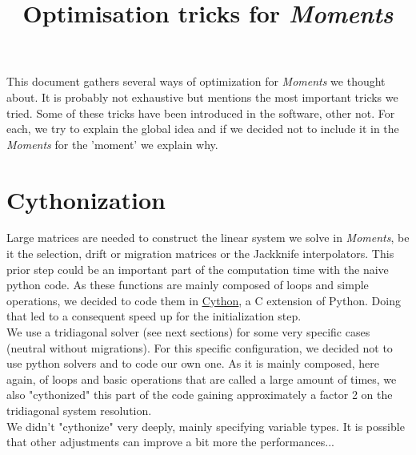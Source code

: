 \documentclass[11pt,a4paper]{article}
\title{\bf Optimisation tricks for \textit{Moments}}
\begin{document}
\maketitle

This document gathers several ways of optimization for \textit{Moments} we thought about. 
It is probably not exhaustive but mentions the most important tricks we tried. Some of these tricks have been introduced in the software, other not. For each, we try to explain the global idea and if we decided not to include it in the \textit{Moments} for the 'moment' we explain why. 

\section{Cythonization}
Large matrices are needed to construct the linear system we solve in \textit{Moments}, be it the selection, drift or migration matrices or the Jackknife interpolators. This prior step could be an important part of the computation time with the naive python code. As these functions are mainly composed of loops and simple operations, we decided to code them in \href{http://cython.org}{\color{blue}\underline{Cython}}, a C extension of Python. Doing that led to a consequent speed up for the initialization step.\\

We use a tridiagonal solver (see next sections) for some very specific cases (neutral without migrations). For this specific configuration, we decided not to use python solvers and to code our own one. As it is mainly composed, here again, of loops and basic operations that are called a large amount of times, we also "cythonized" this part of the code gaining approximately a factor 2 on the tridiagonal system resolution.\\

We didn't "cythonize" very deeply, mainly specifying variable types. It is possible that other adjustments can improve a bit more the performances...
\end{document}
